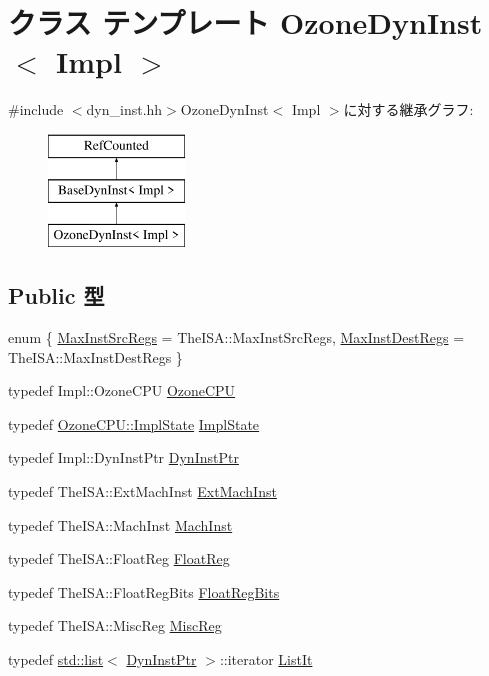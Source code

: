 \hypertarget{classOzoneDynInst}{
\section{クラス テンプレート OzoneDynInst$<$ Impl $>$}
\label{classOzoneDynInst}
}


{\ttfamily \#include $<$dyn\_\-inst.hh$>$}OzoneDynInst$<$ Impl $>$に対する継承グラフ:\begin{figure}[H]
\begin{center}
\leavevmode
\includegraphics[height=3cm]{classOzoneDynInst}
\end{center}
\end{figure}
\subsection*{Public 型}
\begin{DoxyCompactItemize}
\item 
enum \{ \hyperlink{classOzoneDynInst_ab48899087cc647f0f791ed0c459adc53a17b78fe104e3bf28fca535a040514084}{MaxInstSrcRegs} =  TheISA::MaxInstSrcRegs, 
\hyperlink{classOzoneDynInst_ab48899087cc647f0f791ed0c459adc53a6a2e9b17a83d01eb4ee6bbdd739be9eb}{MaxInstDestRegs} =  TheISA::MaxInstDestRegs
 \}
\item 
typedef Impl::OzoneCPU \hyperlink{classOzoneDynInst_a9730cc41bccb218cae8f32869b8d887e}{OzoneCPU}
\item 
typedef \hyperlink{structOzoneThreadState}{OzoneCPU::ImplState} \hyperlink{classOzoneDynInst_af74382499244d5cf3961ff5eaf314518}{ImplState}
\item 
typedef Impl::DynInstPtr \hyperlink{classOzoneDynInst_a028ce10889c5f6450239d9e9a7347976}{DynInstPtr}
\item 
typedef TheISA::ExtMachInst \hyperlink{classOzoneDynInst_a5605d4fc727eae9e595325c90c0ec108}{ExtMachInst}
\item 
typedef TheISA::MachInst \hyperlink{classOzoneDynInst_a4617f528417b8f55f809ae0988284c9b}{MachInst}
\item 
typedef TheISA::FloatReg \hyperlink{classOzoneDynInst_a75484259f1855aabc8d74c6eb1cfe186}{FloatReg}
\item 
typedef TheISA::FloatRegBits \hyperlink{classOzoneDynInst_aab5eeae86499f9bfe15ef79360eccc64}{FloatRegBits}
\item 
typedef TheISA::MiscReg \hyperlink{classOzoneDynInst_aaf5f073a387db0556d1db4bcc45428bc}{MiscReg}
\item 
typedef \hyperlink{classstd_1_1list}{std::list}$<$ \hyperlink{classOzoneDynInst_a028ce10889c5f6450239d9e9a7347976}{DynInstPtr} $>$::iterator \hyperlink{classOzoneDynInst_a184cb829e22cc656acb41864f68f51ea}{ListIt}
\end{DoxyCompactItemize}
